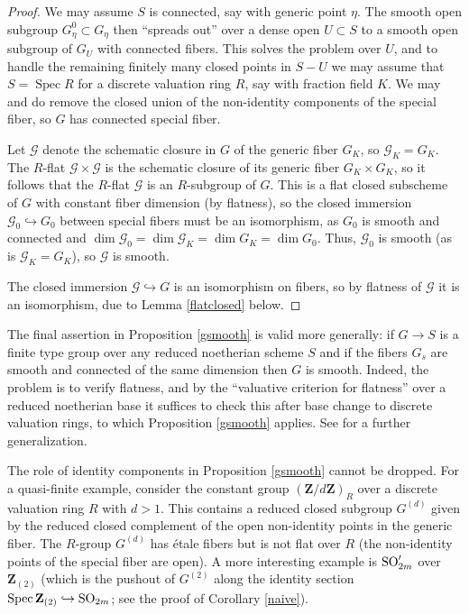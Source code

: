 \documentclass[10pt]{article}
\renewcommand{\(}{\left(}
\renewcommand{\)}{\right)}
\newcommand{\Spec}{\operatorname{Spec}}
\numberwithin{thm}{subsection}
\begin{document}
\begin{proof}
We may assume $S$ is connected, say with generic point $\eta$.
The smooth open subgroup $G_{\eta}^0 \subset G_{\eta}$
then ``spreads out'' over a dense open $U \subset S$ to a smooth open subgroup 
of $G_U$ with connected fibers.  This solves the problem over $U$, 
and to handle the remaining finitely many closed points in $S - U$
we may assume that $S = \Spec R$ for a discrete valuation ring $R$, say with fraction field $K$.
We may and do remove the closed union of the non-identity components of
the special fiber, so $G$ has connected special fiber.

Let $\mathscr{G}$ denote the schematic closure in $G$ of the generic fiber $G_K$,
so $\mathscr{G}_K =  G_K$.
The $R$-flat $\mathscr{G} \times \mathscr{G}$ is the schematic closure
of its generic fiber $G_K \times G_K$, so it follows that the $R$-flat 
$\mathscr{G}$ is an $R$-subgroup of $G$. 
This is a flat closed subscheme of $G$ with constant fiber dimension (by flatness), so
the closed immersion $\mathscr{G}_0 \hookrightarrow G_0$ between special fibers 
must be an isomorphism, as $G_0$ is smooth and connected
and $\dim \mathscr{G}_0 = \dim \mathscr{G}_K = \dim G_K = \dim G_0$.
Thus, $\mathscr{G}_0$ is smooth (as is $\mathscr{G}_K = G_K$), 
so $\mathscr{G}$ is smooth. 

The closed immersion $\mathscr{G} \hookrightarrow G$ 
is an isomorphism on fibers, so by flatness of $\mathscr{G}$ it is an isomorphism, 
due to Lemma \ref{flatclosed} below.
\end{proof}



\begin{rem} The final assertion in Proposition \ref{gsmooth}
is valid more generally: if $G \rightarrow S$ is a finite type
group over any reduced noetherian scheme $S$ and if the fibers $G_s$ are smooth
and connected of the same dimension then $G$ is smooth.
Indeed, the problem is to verify flatness,
and by the ``valuative criterion for flatness'' over a reduced noetherian base
\cite[IV$_3$, 11.8.1]{ega} it suffices to check this after base change
to discrete valuation rings, to which Proposition \ref{gsmooth} applies.
See \cite[VI$_{\rm{B}}$, 4.4]{sga3} for a further generalization.
\end{rem}

The role of identity components in Proposition \ref{gsmooth} cannot be dropped.
For a quasi-finite example, consider the constant
group $({\mathbf{Z}}/d{\mathbf{Z}})_R$ over a discrete
valuation ring $R$ with $d > 1$. This
contains a reduced closed subgroup $G^{(d)}$ given by the reduced closed 
complement of 
the open non-identity points in the generic fiber.  The $R$-group $G^{(d)}$ 
has \'etale fibers
but  is not flat over $R$ (the non-identity points of the special fiber are open).
A more interesting example is ${\rm{SO}}'_{2m}$ over ${\mathbf{Z}}_{(2)}$
(which is the pushout of $G^{(2)}$ along the identity section $\Spec {\mathbf{Z}}_{(2)}
\hookrightarrow {\rm{SO}}_{2m}$; see the proof of Corollary \ref{naive}).
\end{document}
